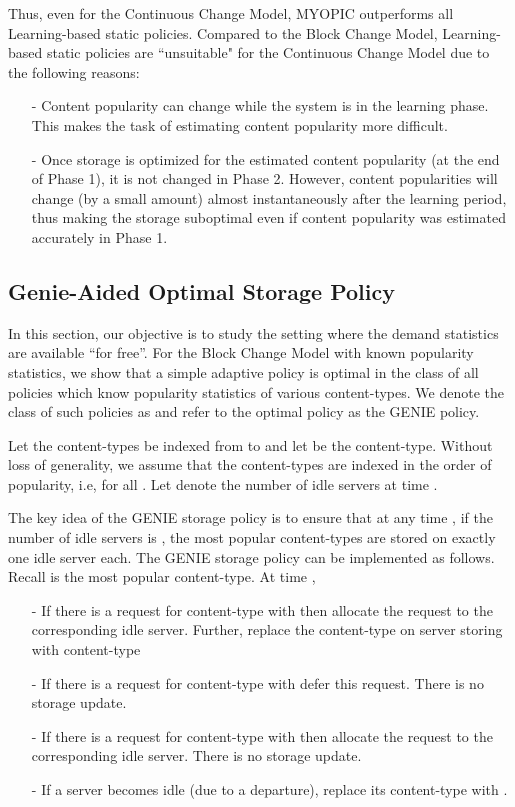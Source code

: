 \documentclass[10pt, conference, letterpaper]{IEEEtran}
\begin{document}
Thus, even for the Continuous Change Model, MYOPIC outperforms all Learning-based static policies.  Compared to the Block Change Model, Learning-based static policies are ``unsuitable" for the Continuous Change Model due to the following reasons:
\begin{itemize}
	\item[-] Content popularity can change while the system is in the learning phase. This makes the task of estimating content popularity more difficult.
	\item[-] Once storage is optimized for the estimated content popularity (at the end of Phase 1), it is not changed in Phase 2. However, content popularities will change (by a small amount) almost instantaneously after the learning period, thus making the storage suboptimal even if content popularity was estimated accurately in Phase 1.
\end{itemize}


\subsection{Genie-Aided Optimal Storage Policy}
\label{subsec:optimal}

In this section, our objective is to study the setting where the
demand statistics are available ``for free''. For the Block Change Model with known popularity statistics, we show that a simple
adaptive policy is optimal in the class of all policies which know
popularity statistics of various content-types. We denote the class of
such policies as  and refer to the optimal policy as the
GENIE policy.


\noindent Let the content-types be indexed from  to  and let
 be the  content-type. Without loss of generality, we
assume that the content-types are indexed in the order of popularity,
i.e,  for all . Let  denote the number of idle servers at time .

The key idea of the GENIE storage policy is to ensure that at any time
, if the number of idle servers is , the 
most popular content-types are stored on exactly one idle server
each. The GENIE storage policy can be implemented as follows. Recall
 is the  most popular content-type. At time ,
\begin{itemize}
	\item[-] If there is a request for content-type  with  then allocate the request to the corresponding idle
	server. Further, replace the content-type on server storing
	 with content-type 
	
	\item[-] If there is a request for content-type  with  defer this request. There is no storage update.
	
	\item[-] If there is a request for content-type  with  then allocate the request to the corresponding idle
	server. There is no storage update.
	
	\item[-] If a server becomes idle (due to a departure), replace its
	content-type with .
\end{itemize}
\end{document}
